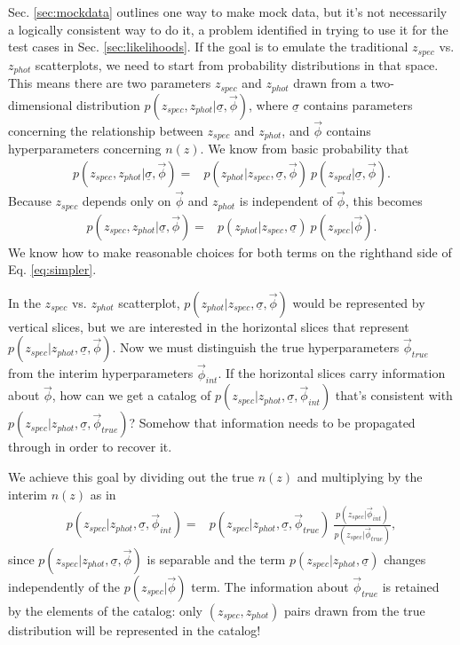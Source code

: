 \documentclass[iop]{emulateapj}
\newcommand{\textul}{\underline}
\begin{document}
Sec. \ref{sec:mockdata} outlines one way to make mock data, but it's not necessarily a logically consistent way to do it, a problem identified in trying to use it for the test cases in Sec. \ref{sec:likelihoods}.  If the goal is to emulate the traditional $z_{spec}$ vs. $z_{phot}$ scatterplots, we need to start from probability distributions in that space.  This means there are two parameters $z_{spec}$ and $z_{phot}$ drawn from a two-dimensional distribution $p(z_{spec}, z_{phot} | \textul{\sigma}, \vec{\phi})$, where $\textul{\sigma}$ contains parameters concerning the relationship between $z_{spec}$ and $z_{phot}$, and $\vec{\phi}$ contains hyperparameters concerning $n(z)$.  We know from basic probability that
\begin{align}
\label{eq:trivial}
p(z_{spec}, z_{phot} | \textul{\sigma}, \vec{\phi}) =& p(z_{phot} | z_{spec}, \textul{\sigma}, \vec{\phi})\ p(z_{sped} | \textul{\sigma}, \vec{\phi}).
\end{align}
Because $z_{spec}$ depends only on $\vec{\phi}$ and $z_{phot}$ is independent of $\vec{\phi}$, this becomes
\begin{align}
\label{eq:simpler}
p(z_{spec}, z_{phot} | \textul{\sigma}, \vec{\phi}) =& p(z_{phot} | z_{spec}, \textul{\sigma})\ p(z_{spec} | \vec{\phi}).
\end{align}
We know how to make reasonable choices for both terms on the righthand side of Eq. \ref{eq:simpler}.

In the $z_{spec}$ vs. $z_{phot}$ scatterplot, $p(z_{phot} | z_{spec}, \textul{\sigma}, \vec{\phi})$ would be represented by vertical slices, but we are interested in the horizontal slices that represent $p(z_{spec} | z_{phot}, \textul{\sigma}, \vec{\phi})$.  Now we must distinguish the true hyperparameters $\vec{\phi}_{true}$ from the interim hyperparameters $\vec{\phi}_{int}$.  If the horizontal slices carry information about $\vec{\phi}$, how can we get a catalog of $p(z_{spec} | z_{phot}, \textul{\sigma}, \vec{\phi}_{int})$ that's consistent with $p(z_{spec} | z_{phot}, \textul{\sigma}, \vec{\phi}_{true})$?  Somehow that information needs to be propagated through in order to recover it.

We achieve this goal by dividing out the true $n(z)$ and multiplying by the interim $n(z)$ as in
\begin{align}
\label{eq:transformation}
p(z_{spec} | z_{phot}, \textul{\sigma}, \vec{\phi}_{int}) =& p(z_{spec} | z_{phot}, \textul{\sigma}, \vec{\phi}_{true})\ \frac{p(z_{spec} | \vec{\phi}_{int})}{p(z_{spec} | \vec{\phi}_{true})},
\end{align}
since $p(z_{spec} | z_{phot}, \textul{\sigma}, \vec{\phi})$ is separable and the term $p(z_{spec} | z_{phot}, \textul{\sigma})$ changes independently of the $p(z_{spec} | \vec{\phi})$ term.  The information about $\vec{\phi}_{true}$ is retained by the elements of the catalog: only $(z_{spec}, z_{phot})$ pairs drawn from the true distribution will be represented in the catalog!
\end{document}
